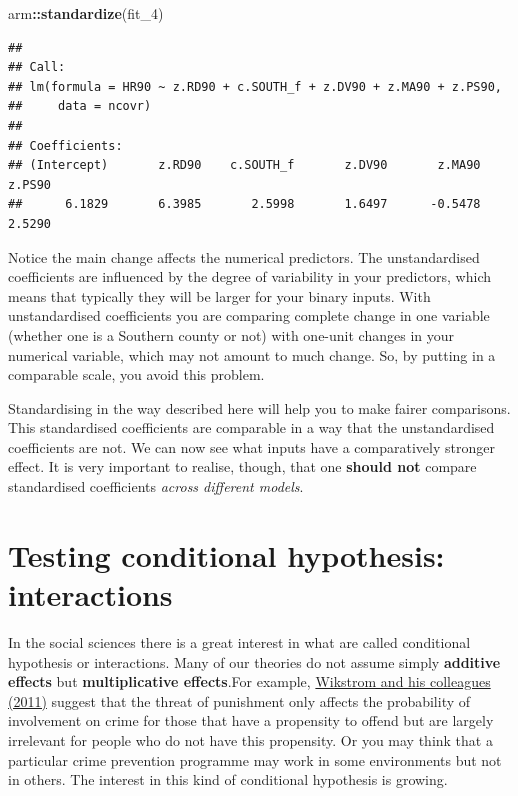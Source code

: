 \documentclass[]{book}
\newenvironment{Shaded}{\begin{snugshade}}{\end{snugshade}}
\newcommand{\DecValTok}[1]{\textcolor[rgb]{0.00,0.00,0.81}{#1}}
\newcommand{\KeywordTok}[1]{\textcolor[rgb]{0.13,0.29,0.53}{\textbf{#1}}}
\newcommand{\NormalTok}[1]{#1}
\newcommand{\OperatorTok}[1]{\textcolor[rgb]{0.81,0.36,0.00}{\textbf{#1}}}
\begin{document}
\begin{Shaded}
\begin{Highlighting}[]
\NormalTok{arm}\OperatorTok{::}\KeywordTok{standardize}\NormalTok{(fit_}\DecValTok{4}\NormalTok{)}
\end{Highlighting}
\end{Shaded}

\begin{verbatim}
## 
## Call:
## lm(formula = HR90 ~ z.RD90 + c.SOUTH_f + z.DV90 + z.MA90 + z.PS90, 
##     data = ncovr)
## 
## Coefficients:
## (Intercept)       z.RD90    c.SOUTH_f       z.DV90       z.MA90       z.PS90  
##      6.1829       6.3985       2.5998       1.6497      -0.5478       2.5290
\end{verbatim}

Notice the main change affects the numerical predictors. The unstandardised coefficients are influenced by the degree of variability in your predictors, which means that typically they will be larger for your binary inputs. With unstandardised coefficients you are comparing complete change in one variable (whether one is a Southern county or not) with one-unit changes in your numerical variable, which may not amount to much change. So, by putting in a comparable scale, you avoid this problem.

Standardising in the way described here will help you to make fairer comparisons. This standardised coefficients are comparable in a way that the unstandardised coefficients are not. We can now see what inputs have a comparatively stronger effect. It is very important to realise, though, that one \textbf{should not} compare standardised coefficients \emph{across different models}.

\hypertarget{testing-conditional-hypothesis-interactions}{%
\section{Testing conditional hypothesis: interactions}\label{testing-conditional-hypothesis-interactions}}

In the social sciences there is a great interest in what are called conditional hypothesis or interactions. Many of our theories do not assume simply \textbf{additive effects} but \textbf{multiplicative effects}.For example, \href{http://euc.sagepub.com/content/8/5/401.short}{Wikstrom and his colleagues (2011)} suggest that the threat of punishment only affects the probability of involvement on crime for those that have a propensity to offend but are largely irrelevant for people who do not have this propensity. Or you may think that a particular crime prevention programme may work in some environments but not in others. The interest in this kind of conditional hypothesis is growing.
\end{document}
